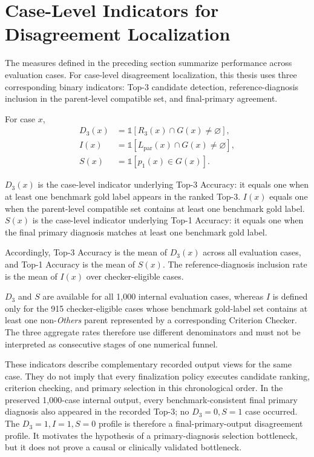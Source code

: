 \documentclass[12pt,a4paper,oneside]{report}
\begin{document}
\section{Case-Level Indicators for Disagreement Localization}
\label{sec:case-level-indicators}

The measures defined in the preceding section summarize performance across evaluation cases. For case-level disagreement localization, this thesis uses three corresponding binary indicators: Top-3 candidate detection, reference-diagnosis inclusion in the parent-level compatible set, and final-primary agreement.

For case $x$,
\[
\begin{aligned}
D_3(x) &= \mathbb{1}[R_3(x)\cap G(x)\neq\varnothing],\\
I(x) &= \mathbb{1}[L_{\mathrm{par}}(x)\cap G(x)\neq\varnothing],\\
S(x) &= \mathbb{1}[p_1(x)\in G(x)].
\end{aligned}
\]

$D_3(x)$ is the case-level indicator underlying Top-3 Accuracy: it equals one when at least one benchmark gold label appears in the ranked Top-3. $I(x)$ equals one when the parent-level compatible set contains at least one benchmark gold label. $S(x)$ is the case-level indicator underlying Top-1 Accuracy: it equals one when the final primary diagnosis matches at least one benchmark gold label.

Accordingly, Top-3 Accuracy is the mean of $D_3(x)$ across all evaluation cases, and Top-1 Accuracy is the mean of $S(x)$. The reference-diagnosis inclusion rate is the mean of $I(x)$ over checker-eligible cases.

$D_3$ and $S$ are available for all 1,000 internal evaluation cases, whereas $I$ is defined only for the 915 checker-eligible cases whose benchmark gold-label set contains at least one non-\emph{Others} parent represented by a corresponding Criterion Checker. The three aggregate rates therefore use different denominators and must not be interpreted as consecutive stages of one numerical funnel.

These indicators describe complementary recorded output views for the same case. They do not imply that every finalization policy executes candidate ranking, criterion checking, and primary selection in this chronological order. In the preserved 1,000-case internal output, every benchmark-consistent final primary diagnosis also appeared in the recorded Top-3; no $D_3=0,S=1$ case occurred. The $D_3=1,I=1,S=0$ profile is therefore a final-primary-output disagreement profile. It motivates the hypothesis of a primary-diagnosis selection bottleneck, but it does not prove a causal or clinically validated bottleneck.
\end{document}
